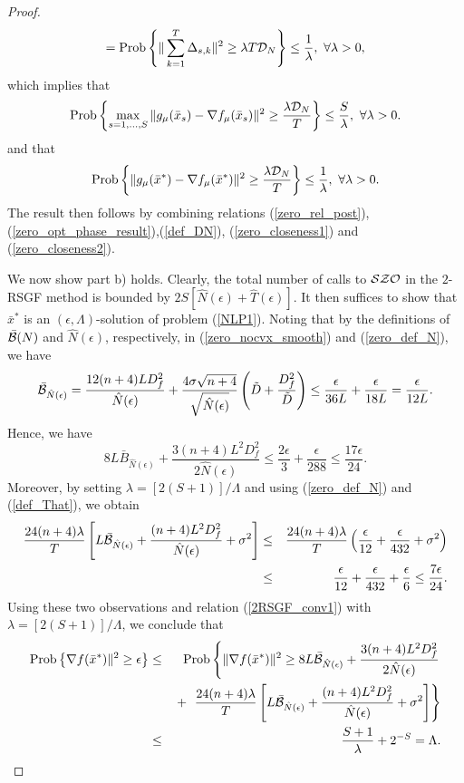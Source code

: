 \documentclass[final]{siamltex}
\newcommand{\beq}{\begin{equation}}
\newcommand{\eeq}{\end{equation}}
\newcommand{\beqas}{\begin{eqnarray*}}
\newcommand{\eeqas}{\end{eqnarray*}}
\def\eqnok#1{(\ref{#1})}
\def\prob{{\rm Prob}}
\def\prob{\mathop{\rm Prob}}
\def\cB{{\cal B}}
\def\cD{{\cal D}}
\begin{document}
\begin{proof}
\[= \prob\left\{ \|\sum_{k=1}^T \Delta_{s,k} \|^2 \ge  \lambda T \cD_N \right\}
\le \frac{1}{\lambda}, \ \forall \lambda > 0,
\]
which implies that
\beq \label{zero_closeness1}
\prob\left\{
\max_{s=1,\ldots,S} \|g_{\mu}(\bar x_s) - \nabla f_{\mu}(\bar x_s)\|^2 \ge \frac{\lambda \cD_N}{T}
 \right\} \le \frac{S}{\lambda},  \ \forall \lambda > 0.
\eeq
and that
\beq \label{zero_closeness2}
\prob\left\{
\|g_{\mu}(\bar x^*) - \nabla f_{\mu}(\bar x^*)\|^2  \ge  \frac{\lambda \cD_N}{T}
\right\} \le \frac{1}{\lambda}, \ \forall \lambda > 0.
\eeq
The result then follows by combining relations \eqnok{zero_rel_post}, \eqnok{zero_opt_phase_result},\eqnok{def_DN},
\eqnok{zero_closeness1} and \eqnok{zero_closeness2}.

We now show part b) holds. Clearly, the total number of calls to $\cal SZO$ in the $2$-RSGF method
is bounded by $2 S[\hat N(\epsilon)+\hat T(\epsilon)]$. It then suffices to
show that $\bar x^*$ is an $(\epsilon, \Lambda)$-solution
of problem \eqnok{NLP1}.
Noting that by the definitions of $\bar{\cB}(N)$ and $\hat N(\epsilon)$, respectively, in \eqnok{zero_nocvx_smooth}
and \eqnok{zero_def_N}, we have
\[
\bar{\cB}_{\hat N(\epsilon)} = \frac{12(n+4)L D_f^2}{\hat N(\epsilon)} +
\frac{4 \sigma \sqrt {n+4}}{\sqrt{\hat N(\epsilon)}} \left(\tilde D + \frac{D_f^2}{\tilde D}\right)
\le \frac{\epsilon}{36L} + \frac{\epsilon}{18L} = \frac{\epsilon}{12L}.
\]
Hence, we have
\[
8L \bar B_{\hat N(\epsilon)} + \frac{3(n+4) L^2 D_f^2}{2 \hat N(\epsilon)} \le
\frac{2\epsilon}{3} + \frac{\epsilon}{288} \le \frac{17 \epsilon}{24}.
\]
Moreover, by setting $\lambda = [2 (S+1)]/\Lambda$ and using \eqnok{zero_def_N} and \eqnok{def_That}, we obtain
\beqas
\frac{24(n+4) \lambda}{T} \left[ L \bar{\cB}_{\hat N(\epsilon)} + \frac{(n+4) L^2 D_f^2}{\hat N(\epsilon)} + \sigma^2\right]
&\le& \frac{24(n+4) \lambda}{T} \left( \frac{\epsilon}{12} + \frac{\epsilon}{432} +\sigma^2\right)\\
&\le&  \frac{\epsilon}{12} + \frac{\epsilon}{432} + \frac{\epsilon}{6} \le \frac{7 \epsilon}{24}.
\eeqas
Using these two observations and relation \eqnok{2RSGF_conv1} with $\lambda = [2 (S+1)]/\Lambda$, we conclude that
\beqas
\prob\left\{\nabla f(\bar x^*)\|^2  \ge \epsilon \right\} &\le&
\prob\left\{
\|\nabla f(\bar x^*)\|^2 \ge  8 L \bar{\cB}_{\hat N(\epsilon)} + \frac{3(n+4) L^2 D_f^2}{2 \hat N(\epsilon)} \right. \\
&& \, + \left.\,\, \frac{24(n+4)\lambda}{T}
\left[L \bar{\cB}_{\hat N(\epsilon)} + \frac{(n+4) L^2 D_f^2}{\hat N(\epsilon)} + \sigma^2\right]
\right\} \\
&\le& \frac{S+1}{\lambda} + 2^{-S} = \Lambda.
\eeqas
\end{proof}
\end{document}
